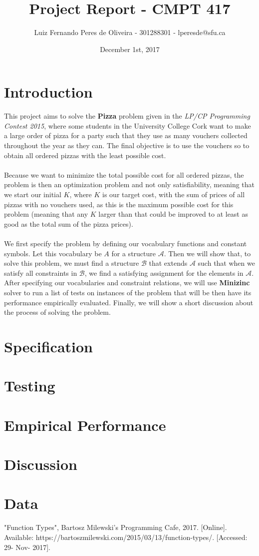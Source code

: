 \documentclass[conference]{IEEEtran}
\title{Project Report - CMPT 417}
\author{Luiz Fernando Peres de Oliveira - 301288301 - lperesde@sfu.ca}
\date{December 1st, 2017}
\newcommand\tab[1][0.3cm]{\hspace*{#1}}
\begin{document}
\maketitle
\section{Introduction}
This project aims to solve the \textbf{Pizza} problem given in the \textit{LP/CP Programming Contest 2015}, where some students in the University College Cork want to make a large order of pizza for a party such that they use as many vouchers collected throughout the year as they can. The final objective is to use the vouchers so to obtain all ordered pizzas with the least possible cost.
\\
\\
\tab Because we want to minimize the total possible cost for all ordered pizzas, the problem is then an optimization problem and not only satisfiability, meaning that we start our initial $K$, where $K$ is our target cost, with the sum of prices of all pizzas with no vouchers used, as this is the maximum possible cost for this problem (meaning that any $K$ larger than that could be improved to at least as good as the total sum of the pizza prices).
\\
\\
\tab We first specify the problem by defining our vocabulary functions and constant symbols. Let this vocabulary be $A$ for a structure $\mathcal{A}$. Then we will show that, to solve this problem, we must find a structure $\mathcal{B}$ that extends $\mathcal{A}$ such that when we satisfy all constraints in $\mathcal{B}$, we find a satisfying assignment for the elements in $\mathcal{A}$. After specifying our vocabularies and constraint relations, we will use \textbf{Minizinc} solver to run a list of tests on instances of the problem that will be then have its performance empirically evaluated. Finally, we will show a short discussion about the process of solving the problem.
\section{Specification}
\section{Testing}
\section{Empirical Performance}
\section{Discussion}
\section{Data}
\begin{thebibliography}{00}
 "Function Types", Bartosz Milewski's Programming Cafe, 2017. [Online]. Available: https://bartoszmilewski.com/2015/03/13/function-types/. [Accessed: 29- Nov- 2017].
\end{thebibliography}
\end{document}
